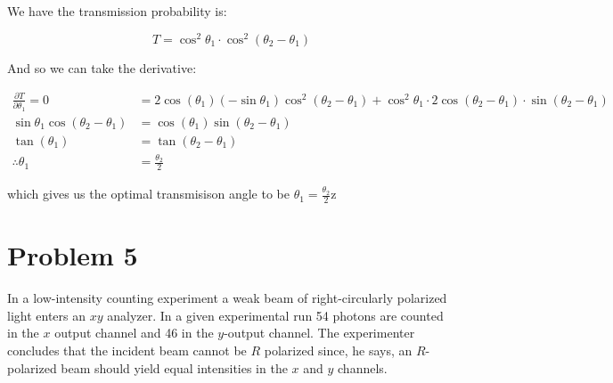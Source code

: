 \documentclass[10pt]{article}
\begin{document}
\begin{enumerate}
        \begin{solution}
            We have the transmission probability is: 

            \[ T = \cos^2 \theta_1 \cdot \cos^2(\theta_2 - \theta_1)\] 

            And so we can take the derivative: 

            \begin{align*}
                \frac{\partial T}{\partial \theta_1} = 0 &= 2\cos(\theta_1) (-\sin \theta_1)\cos^2(\theta_2 - \theta_1) + \cos^2 \theta_1 \cdot 2\cos(\theta_2 - \theta_1) \cdot \sin (\theta_2 - \theta_1)\\
                \sin \theta_1 \cos(\theta_2 - \theta_1) &= \cos(\theta_1)\sin(\theta_2 - \theta_1)\\
                \tan(\theta_1) &= \tan(\theta_2 -\theta_1)\\
                \therefore \theta_1 &= \frac{\theta_2}{2}
            \end{align*}

            which gives us the optimal transmisison angle to be $\theta_1 = \frac{\theta_2}{2}$z
        \end{solution}
    \end{enumerate}

    \pagebreak 

    \section*{Problem 5}
    In a low-intensity counting experiment a weak beam of right-circularly polarized light enters an $xy$ analyzer. In a given experimental run 54 photons are counted in the $x$ output channel and 46 in the $y$-output channel. The experimenter concludes that the incident beam cannot be $R$ polarized since, he says, an $R$-polarized beam should yield equal intensities in the $x$ and $y$ channels.
\end{document}
